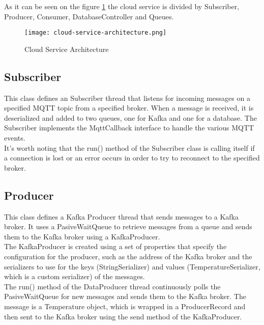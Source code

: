 \documentclass[../informe.tex]{subfiles}
\begin{document}
As it can be seen on the figure \ref{cloud-service-architecture} the cloud service is divided by Subscriber, Producer, Consumer, DatabaseController and Queues.


\begin{figure}[!htbp]
    \texttt{[image: cloud-service-architecture.png]}
    \centering
    \caption{Cloud Service Architecture}
    \label{cloud-service-architecture}
\end{figure}

\newpage

\subsection{Subscriber}
This class defines an Subscriber thread that listens for incoming messages on a specified MQTT topic from a specified broker. When a message is received, it is deserialized and added to two queues, one for Kafka and one for a database. The Subscriber implements the MqttCallback interface to handle the various MQTT events. \\

It's worth noting that the run() method of the Subscriber class is calling itself if a connection is lost or an error occurs in order to try to reconnect to the specified broker. \\

\subsection{Producer}
This class defines a Kafka Producer thread that sends messages to a Kafka broker. It uses a PasiveWaitQueue to retrieve messages from a queue and sends them to the Kafka broker using a KafkaProducer. \\

The KafkaProducer is created using a set of properties that specify the configuration for the producer, such as the address of the Kafka broker and the serializers to use for the keys (StringSerializer) and values (TemperatureSerializer, which is a custom serializer) of the messages. \\

The run() method of the DataProducer thread continuously polls the PasiveWaitQueue for new messages and sends them to the Kafka broker. The message is a Temperature object, which is wrapped in a ProducerRecord and then sent to the Kafka broker using the send method of the KafkaProducer. \\
\end{document}
